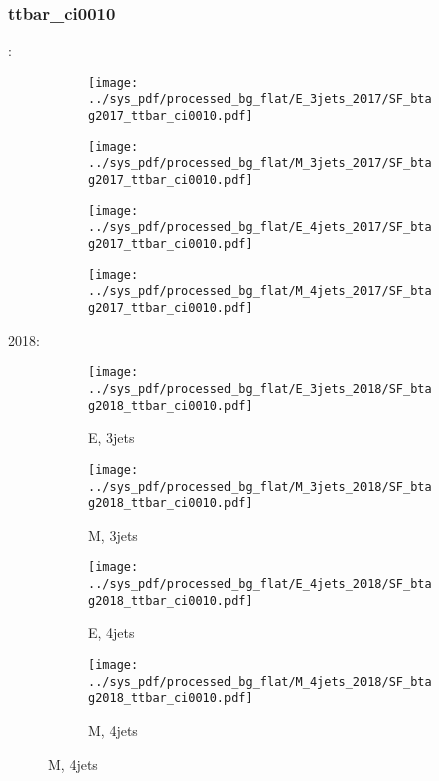 \documentclass{beamer}
\begin{document}
\begin{frame}
\frametitle{ttbar_ci0010}
\fontsize{5}{1}:
\begin{figure}
\centering
\begin{subfigure}[b]{0.24\textwidth}
\texttt{[image: ../sys\_pdf/processed\_bg\_flat/E\_3jets\_2017/SF\_btag2017\_ttbar\_ci0010.pdf]}
\end{subfigure}
\begin{subfigure}[b]{0.24\textwidth}
\texttt{[image: ../sys\_pdf/processed\_bg\_flat/M\_3jets\_2017/SF\_btag2017\_ttbar\_ci0010.pdf]}
\end{subfigure}
\begin{subfigure}[b]{0.24\textwidth}
\texttt{[image: ../sys\_pdf/processed\_bg\_flat/E\_4jets\_2017/SF\_btag2017\_ttbar\_ci0010.pdf]}
\end{subfigure}
\begin{subfigure}[b]{0.24\textwidth}
\texttt{[image: ../sys\_pdf/processed\_bg\_flat/M\_4jets\_2017/SF\_btag2017\_ttbar\_ci0010.pdf]}
\end{subfigure}
\end{figure}
2018:
\begin{figure}
\centering
\begin{subfigure}[b]{0.24\textwidth}
\texttt{[image: ../sys\_pdf/processed\_bg\_flat/E\_3jets\_2018/SF\_btag2018\_ttbar\_ci0010.pdf]}
\captionsetup{font=tiny}
\caption{E, 3jets}
\end{subfigure}
\begin{subfigure}[b]{0.24\textwidth}
\texttt{[image: ../sys\_pdf/processed\_bg\_flat/M\_3jets\_2018/SF\_btag2018\_ttbar\_ci0010.pdf]}
\captionsetup{font=tiny}
\caption{M, 3jets}
\end{subfigure}
\begin{subfigure}[b]{0.24\textwidth}
\texttt{[image: ../sys\_pdf/processed\_bg\_flat/E\_4jets\_2018/SF\_btag2018\_ttbar\_ci0010.pdf]}
\captionsetup{font=tiny}
\caption{E, 4jets}
\end{subfigure}
\begin{subfigure}[b]{0.24\textwidth}
\texttt{[image: ../sys\_pdf/processed\_bg\_flat/M\_4jets\_2018/SF\_btag2018\_ttbar\_ci0010.pdf]}
\captionsetup{font=tiny}
\caption{M, 4jets}
\end{subfigure}
\end{figure}
\end{frame}
\end{document}

